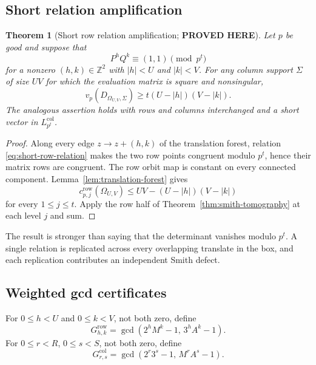 \documentclass[11pt]{article}
\newtheorem{theorem}{Theorem}[section]
\theoremstyle{definition}
\theoremstyle{remark}
\newcommand{\Z}{\mathbb Z}
\newcommand{\vp}{v_p}
\newcommand{\crow}{c^{\mathrm{row}}}
\newcommand{\statusproved}{\textcolor{statusgreen}{\textbf{PROVED HERE}}}
\begin{document}
\subsection{Short relation amplification}

\begin{theorem}[Short row relation amplification; \statusproved]\label{thm:short-relation}
Let $p$ be good and suppose that
\begin{equation}\label{eq:short-row-relation}
P^hQ^k\equiv(1,1)\pmod{p^t}
\end{equation}
for a nonzero $(h,k)\in\Z^2$ with $|h|<U$ and $|k|<V$.  For any column support $\Sigma$ of size $UV$ for which the evaluation matrix is square and nonsingular,
\begin{equation}\label{eq:short-relation-valuation}
\vp(D_{\Omega_{U,V},\Sigma})
\ge t(U-|h|)(V-|k|).
\end{equation}
The analogous assertion holds with rows and columns interchanged and a short vector in $L^{\mathrm{col}}_{p^t}$.
\end{theorem}

\begin{proof}
Along every edge $z\to z+(h,k)$ of the translation forest, relation \eqref{eq:short-row-relation} makes the two row points congruent modulo $p^t$, hence their matrix rows are congruent.  The row orbit map is constant on every connected component.  Lemma~\ref{lem:translation-forest} gives
\[
\crow_{p,j}(\Omega_{U,V})\le UV-(U-|h|)(V-|k|)
\]
for every $1\le j\le t$.  Apply the row half of Theorem~\ref{thm:smith-tomography} at each level $j$ and sum.
\end{proof}

The result is stronger than saying that the determinant vanishes modulo $p^t$.  A single relation is replicated across every overlapping translate in the box, and each replication contributes an independent Smith defect.

\subsection{Weighted gcd certificates}

For $0\le h<U$ and $0\le k<V$, not both zero, define
\begin{equation}\label{eq:row-gcd}
G^{\mathrm{row}}_{h,k}
=\gcd(2^hM^k-1,\,3^hA^k-1).
\end{equation}
For $0\le r<R$, $0\le s<S$, not both zero, define
\begin{equation}\label{eq:col-gcd}
G^{\mathrm{col}}_{r,s}
=\gcd(2^r3^s-1,\,M^rA^s-1).
\end{equation}
\end{document}
